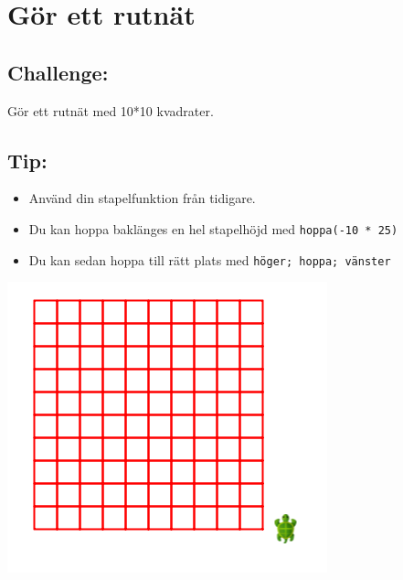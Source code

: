 \chapter{Gör ett rutnät}
\begin{multicols}{2}
\section*{\color{BrickRed}Challenge:}
Gör ett rutnät med 10*10 kvadrater.
\section*{\color{OliveGreen}Tip:}


\begin{itemize}

\item {Använd din stapelfunktion från tidigare.}
\item {Du kan hoppa baklänges en hel stapelhöjd med \lstinline{hoppa(-10 * 25)}}
\item {Du kan sedan hoppa till rätt plats med \lstinline{höger; hoppa; vänster}}

\end{itemize}



\columnbreak

\begin{center}
\includegraphics{../img/square-grid.png}
\end{center}

\end{multicols}

